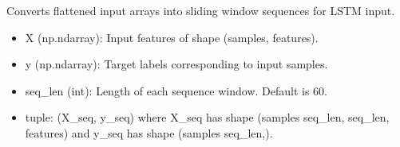 \documentclass[letterpaper,10pt,english]{sphinxmanual}
\begin{document}
\begin{fulllineitems}
\label{\detokenize{lstm_results_real_data:lstm_results_real_data.create_sequences}}
\pysigstartsignatures
{}
\pysigstopsignatures
\sphinxAtStartPar
Converts flattened input arrays into sliding window sequences for LSTM input.
\begin{description}
\begin{itemize}
\item {} 
\sphinxAtStartPar
X (np.ndarray): Input features of shape (samples, features).

\item {} 
\sphinxAtStartPar
y (np.ndarray): Target labels corresponding to input samples.

\item {} 
\sphinxAtStartPar
seq\_len (int): Length of each sequence window. Default is 60.

\end{itemize}

\begin{itemize}
\item {} 
\sphinxAtStartPar
tuple: (X\_seq, y\_seq) where X\_seq has shape (samples \sphinxhyphen{} seq\_len, seq\_len, features) and y\_seq has shape (samples \sphinxhyphen{} seq\_len,).

\end{itemize}

\end{description}

\end{fulllineitems}

\end{document}
